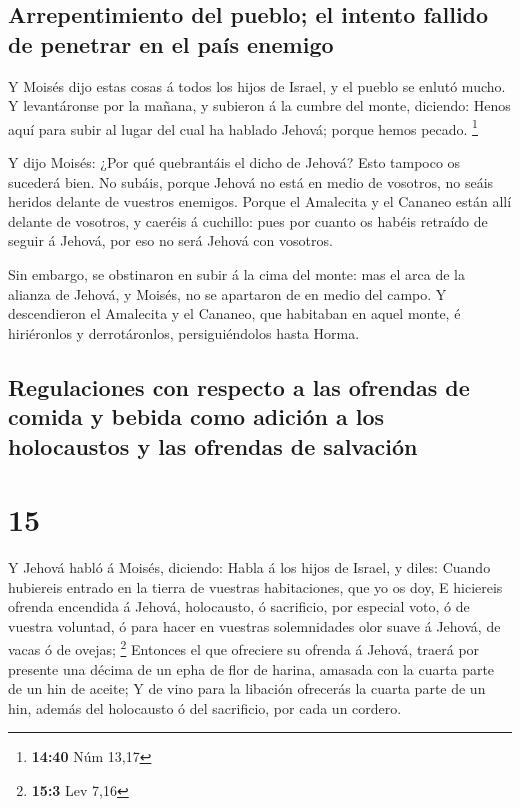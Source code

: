 \hypertarget{arrepentimiento-del-pueblo-el-intento-fallido-de-penetrar-en-el-pauxeds-enemigo}{%
\subsection{Arrepentimiento del pueblo; el intento fallido de penetrar
en el país
enemigo}\label{arrepentimiento-del-pueblo-el-intento-fallido-de-penetrar-en-el-pauxeds-enemigo}}

 Y Moisés dijo estas cosas á todos los hijos de Israel, y
el pueblo se enlutó mucho.  Y levantáronse por la mañana,
y subieron á la cumbre del monte, diciendo: Henos aquí para subir al
lugar del cual ha hablado Jehová; porque hemos pecado. \footnote{\textbf{14:40}
  Núm 13,17}

 Y dijo Moisés: ¿Por qué quebrantáis el dicho de Jehová?
Esto tampoco os sucederá bien.  No subáis, porque Jehová
no está en medio de vosotros, no seáis heridos delante de vuestros
enemigos.  Porque el Amalecita y el Cananeo están allí
delante de vosotros, y caeréis á cuchillo: pues por cuanto os habéis
retraído de seguir á Jehová, por eso no será Jehová con vosotros.

 Sin embargo, se obstinaron en subir á la cima del monte:
mas el arca de la alianza de Jehová, y Moisés, no se apartaron de en
medio del campo.  Y descendieron el Amalecita y el
Cananeo, que habitaban en aquel monte, é hiriéronlos y derrotáronlos,
persiguiéndolos hasta Horma.

\hypertarget{regulaciones-con-respecto-a-las-ofrendas-de-comida-y-bebida-como-adiciuxf3n-a-los-holocaustos-y-las-ofrendas-de-salvaciuxf3n}{%
\subsection{Regulaciones con respecto a las ofrendas de comida y bebida
como adición a los holocaustos y las ofrendas de
salvación}\label{regulaciones-con-respecto-a-las-ofrendas-de-comida-y-bebida-como-adiciuxf3n-a-los-holocaustos-y-las-ofrendas-de-salvaciuxf3n}}

\hypertarget{section-14}{%
\section{15}\label{section-14}}

 Y Jehová habló á Moisés, diciendo:  Habla á
los hijos de Israel, y diles: Cuando hubiereis entrado en la tierra de
vuestras habitaciones, que yo os doy,  E hiciereis ofrenda
encendida á Jehová, holocausto, ó sacrificio, por especial voto, ó de
vuestra voluntad, ó para hacer en vuestras solemnidades olor suave á
Jehová, de vacas ó de ovejas; \footnote{\textbf{15:3} Lev 7,16}
 Entonces el que ofreciere su ofrenda á Jehová, traerá por
presente una décima de un epha de flor de harina, amasada con la cuarta
parte de un hin de aceite;  Y de vino para la libación
ofrecerás la cuarta parte de un hin, además del holocausto ó del
sacrificio, por cada un cordero.

